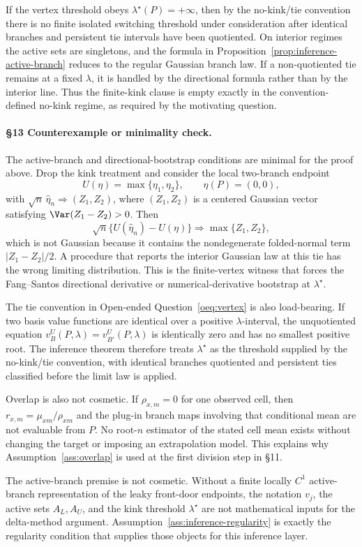 If the vertex threshold obeys \(\lambda^\star(P)=+\infty\), then by the no-kink/tie
convention there is no finite isolated switching threshold under consideration after
identical branches and persistent tie intervals have been quotiented.  On interior
regimes the active sets are singletons, and the formula in
Proposition~\ref{prop:inference-active-branch} reduces to the regular Gaussian branch
law.  If a non-quotiented tie remains at a fixed \(\lambda\), it is handled by the
directional formula rather than by the interior line.  Thus the finite-kink clause is
empty exactly in the convention-defined no-kink regime, as required by the motivating
question.

\paragraph{\S13 Counterexample or minimality check.}
The active-branch and directional-bootstrap conditions are minimal for the proof above.
Drop the kink treatment and consider the local two-branch endpoint
\[
  U(\eta)=\max\{\eta_1,\eta_2\},\qquad \eta(P)=(0,0),
\]
with \(\sqrt n\,\widehat\eta_n\Rightarrow (Z_1,Z_2)\), where
\((Z_1,Z_2)\) is a centered Gaussian vector satisfying
\(\Var(Z_1-Z_2)>0\).  Then
\[
  \sqrt n\{U(\widehat\eta_n)-U(\eta)\}
  \Rightarrow
  \max\{Z_1,Z_2\},
\]
which is not Gaussian because it contains the nondegenerate folded-normal term
\(|Z_1-Z_2|/2\).  A
procedure that reports the interior Gaussian law at this tie has the wrong limiting
distribution.  This is the finite-vertex witness that forces the
Fang--Santos directional derivative or numerical-derivative bootstrap at
\(\lambda^\star\).

The tie convention in Open-ended Question~\ref{oeq:vertex} is also load-bearing.  If
two basis value functions are identical over a positive \(\lambda\)-interval, the
unquotiented equation \(v_B^U(P,\lambda)=v_{B'}^U(P,\lambda)\) is identically zero and
has no smallest positive root.  The inference theorem therefore treats
\(\lambda^\star\) as the threshold supplied by the no-kink/tie convention, with
identical branches quotiented and persistent ties classified before the limit law is
applied.

Overlap is also not cosmetic.  If \(\rho_{x,m}=0\) for one observed cell, then
\(r_{x,m}=\mu_{xm}/\rho_{xm}\) and the plug-in branch maps involving that conditional
mean are not evaluable from \(P\).  No root-\(n\) estimator of the stated cell mean
exists without changing the target or imposing an extrapolation model.  This explains
why Assumption~\ref{ass:overlap} is used at the first division step in \S11.

The active-branch premise is not cosmetic.  Without a finite locally \(C^1\)
active-branch representation of the leaky front-door endpoints, the notation \(v_j\),
the active sets \(A_L,A_U\), and the kink threshold \(\lambda^\star\) are not
mathematical inputs for the delta-method argument.  Assumption~\ref{ass:inference-regularity}
is exactly the regularity condition that supplies those objects for this inference
layer.
